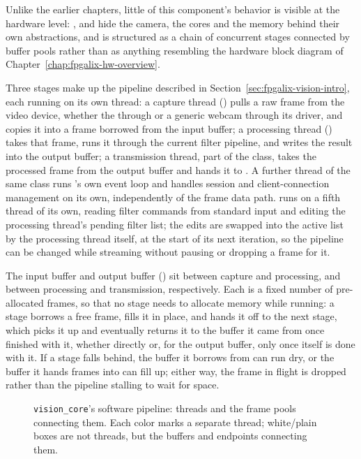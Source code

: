 Unlike the earlier chapters, little of this component's behavior is visible at the hardware level: ,  and  hide the camera, the  cores and the memory behind their own abstractions, and  is structured as a chain of concurrent stages connected by buffer pools rather than as anything resembling the hardware block diagram of Chapter~\ref{chap:fpgalix-hw-overview}.

Three stages make up the pipeline described in Section~\ref{sec:fpgalix-vision-intro}, each running on its own thread: a capture thread () pulls a raw frame from the video device, whether the  through  or a generic webcam through its driver, and copies it into a frame borrowed from the input buffer; a processing thread () takes that frame, runs it through the current filter pipeline, and writes the result into the output buffer; a transmission thread, part of the  class, takes the processed frame from the output buffer and hands it to . A further thread of the same class runs 's own event loop and handles  session and client-connection management on its own, independently of the frame data path.  runs on a fifth thread of its own, reading filter commands from standard input and editing the processing thread's pending filter list; the edits are swapped into the active list by the processing thread itself, at the start of its next iteration, so the pipeline can be changed while streaming without pausing or dropping a frame for it.

The input buffer and output buffer () sit between capture and processing, and between processing and transmission, respectively. Each is a fixed number of pre-allocated frames, so that no stage needs to allocate memory while running: a stage borrows a free frame, fills it in place, and hands it off to the next stage, which picks it up and eventually returns it to the buffer it came from once finished with it, whether directly or, for the output buffer, only once  itself is done with it. If a stage falls behind, the buffer it borrows from can run dry, or the buffer it hands frames into can fill up; either way, the frame in flight is dropped rather than the pipeline stalling to wait for space.

\begin{landscape}
\begin{figure}[p]
    \centering
    
    \caption{\texttt{vision\_core}'s software pipeline: threads and the frame pools connecting them. Each color marks a separate thread; white/plain boxes are not threads, but the buffers and endpoints connecting them.}
    \label{fig:fpgalix-vision-pipeline}
\end{figure}
\end{landscape}


